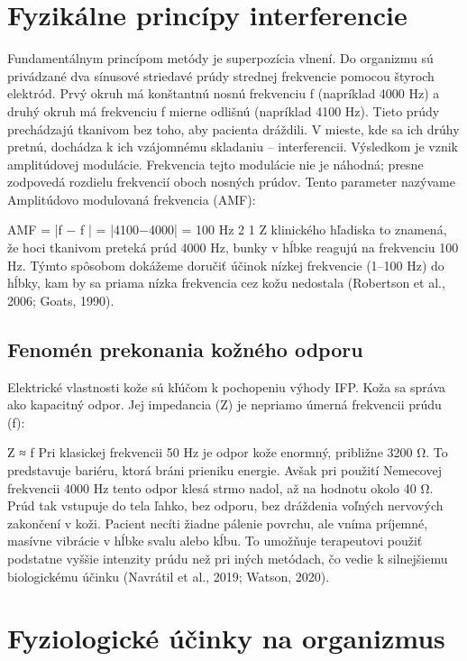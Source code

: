 \section{Fyzikálne princípy interferencie}

Fundamentálnym princípom metódy je superpozícia vlnení. Do organizmu sú privádzané dva sínusové striedavé prúdy strednej frekvencie pomocou štyroch elektród. Prvý okruh má konštantnú nosnú frekvenciu f (napríklad 4000 Hz) a druhý okruh má frekvenciu f mierne odlišnú (napríklad 4100 Hz). Tieto prúdy prechádzajú tkanivom bez toho, aby pacienta dráždili. V mieste, kde sa ich drúhy pretnú, dochádza k ich vzájomnému skladaniu – interferencii. Výsledkom je vznik amplitúdovej modulácie. Frekvencia tejto modulácie nie je náhodná; presne zodpovedá rozdielu frekvencií oboch nosných prúdov. Tento parameter nazývame Amplitúdovo modulovaná frekvencia (AMF): 

AMF = |f − f | = |4100−4000| = 100 Hz 2 1 Z klinického hľadiska to znamená, že hoci tkanivom preteká prúd 4000 Hz, bunky v hĺbke reagujú na frekvenciu 100 Hz. Týmto spôsobom dokážeme doručiť účinok nízkej frekvencie (1–100 Hz) do hĺbky, kam by sa priama nízka frekvencia cez kožu nedostala (Robertson et al., 2006; Goats, 1990). 

\subsection{Fenomén prekonania kožného odporu}

Elektrické vlastnosti kože sú kľúčom k pochopeniu výhody IFP. Koža sa správa ako kapacitný odpor. Jej impedancia (Z) je nepriamo úmerná frekvencii prúdu (f): 

Z ≈ f Pri klasickej frekvencii 50 Hz je odpor kože enormný, približne 3200 Ω. To predstavuje bariéru, ktorá bráni prieniku energie. Avšak pri použití Nemecovej frekvencii 4000 Hz tento odpor klesá strmo nadol, až na hodnotu okolo 40 Ω. Prúd tak vstupuje do tela ľahko, bez odporu, bez dráždenia voľných nervových zakončení v koži. Pacient necíti žiadne pálenie povrchu, ale vníma príjemné, masívne vibrácie v hĺbke svalu alebo kĺbu. To umožňuje terapeutovi použiť podstatne vyššie intenzity prúdu než pri iných metódach, čo vedie k silnejšiemu biologickému účinku (Navrátil et al., 2019; Watson, 2020). 

\section{Fyziologické účinky na organizmus}

